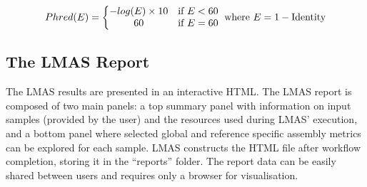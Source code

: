 \begin{equation} \label{ch5_eq1}
    Phred(E) = \left\{\begin{matrix}
-log(E)\times 10 & \textup{if }E < 60\\ 
 60 & \textup{if }E = 60
\end{matrix}\right. \\
\textup{ where }E = 1-\textup{Identity}
\end{equation}

\subsection{The LMAS Report}

The LMAS results are presented in an interactive HTML. The LMAS report is composed of two main panels: a top summary panel with information on input samples (provided by the user) and the resources used during LMAS’ execution, and a bottom panel where selected global and reference specific assembly metrics can be explored for each sample. LMAS constructs the HTML file after workflow completion, storing it in the “reports” folder. The report data can be easily shared between users and requires only a browser for visualisation.

